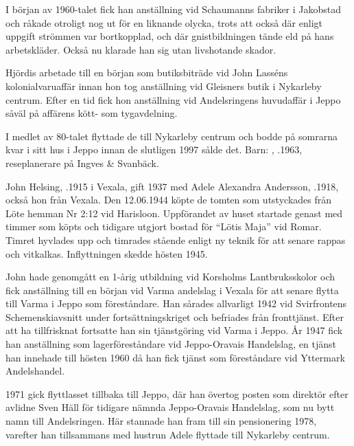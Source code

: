 I början av 1960-talet fick han anställning vid Schaumanns fabriker i Jakobstad och råkade otroligt nog ut för en liknande olycka, trots att också där enligt uppgift strömmen var bortkopplad, och där gnistbildningen tände eld på hans arbetskläder. Också nu klarade han sig utan livshotande skador.

Hjördis arbetade till en början som butiksbiträde vid John Lasséns kolonialvaruaffär innan hon tog anställning vid Gleisners butik i Nykarleby centrum. Efter en tid fick hon anställning vid Andelsringens huvudaffär i Jeppo såväl på affärens kött- som tygavdelning.

I medlet av 80-talet flyttade de till Nykarleby centrum och bodde på 	somrarna kvar i sitt hus i Jeppo innan de slutligen 1997 sålde det.
Barn:  , .1963, reseplanerare på Ingves \& Svanbäck.


John Helsing, .1915 i Vexala, gift 1937 med Adele Alexandra Andersson, .1918, också hon från Vexala. Den 12.06.1944  köpte de tomten som utstyckades från Löte hemman Nr 2:12 vid Harisloon. Uppförandet av huset startade genast med timmer som 	köpts och tidigare utgjort bostad för ``Lötis Maja'' vid Romar. Timret hyvlades upp och timrades stående enligt ny teknik för att senare 	rappas och vitkalkas. Inflyttningen skedde hösten 1945.

John hade genomgått en 1-årig utbildning vid Korsholms Lantbruksskolor och fick anställning till en början vid Varma andelslag i	Vexala för att senare flytta till Varma i Jeppo som föreståndare. Han sårades allvarligt 1942 vid Svirfrontens Schemenskiavsnitt	under fortsättningskriget och befriades från fronttjänst. Efter att ha tillfrisknat fortsatte han sin tjänstgöring vid Varma i Jeppo. År 1947	fick han anställning som lagerföreståndare vid Jeppo-Oravais Handelslag, en tjänst han innehade till hösten 1960 då han fick tjänst som 	föreståndare vid Yttermark Andelshandel.

1971 gick flyttlasset tillbaka till Jeppo, där han övertog posten som	direktör efter avlidne Sven Häll för tidigare nämnda Jeppo-Oravais	Handelslag, som nu bytt namn till Andelsringen. Här stannade han	fram till sin pensionering 1978, varefter han tillsammans med hustrun Adele flyttade till Nykarleby centrum.


